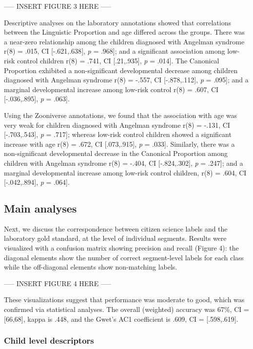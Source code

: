 \documentclass[
  english,
  ,man]{apa6}
\begin{document}
----- INSERT FIGURE 3 HERE -----

Descriptive analyses on the laboratory annotations showed that correlations between the Linguistic Proportion and age differed across the groups. There was a near-zero relationship among the children diagnosed with Angelman syndrome r(8) = .015, CI {[}-.621,.638{]}, \emph{p} = .968{]}; and a significant association among low-risk control children r(8) = .741, CI {[}.21,.935{]}, \emph{p} = .014{]}. The Canonical Proportion exhibited a non-significant developmental decrease among children diagnosed with Angelman syndrome r(8) = -.557, CI {[}-.878,.112{]}, \emph{p} = .095{]}; and a marginal developmental increase among low-risk control r(8) = .607, CI {[}-.036,.895{]}, \emph{p} = .063{]}.

Using the Zooniverse annotations, we found that the association with age was very weak for children diagnosed with Angelman syndrome r(8) = -.131, CI {[}-.703,.543{]}, \emph{p} = .717{]}; whereas low-risk control children showed a significant increase with age r(8) = .672, CI {[}.073,.915{]}, \emph{p} = .033{]}. Similarly, there was a non-significant developmental decrease in the Canonical Proportion among children with Angelman syndrome r(8) = -.404, CI {[}-.824,.302{]}, \emph{p} = .247{]}; and a marginal developmental increase among low-risk control children, r(8) = .604, CI {[}-.042,.894{]}, \emph{p} = .064{]}.

\hypertarget{main-analyses}{%
\subsection{Main analyses}\label{main-analyses}}

Next, we discuss the correspondence between citizen science labels and the laboratory gold standard, at the level of individual segments. Results were visualized with a confusion matrix showing precision and recall (Figure 4): the diagonal elements show the number of correct segment-level labels for each class while the off-diagonal elements show non-matching labels.

----- INSERT FIGURE 4 HERE -----

These visualizations suggest that performance was moderate to good, which was confirmed via statistical analyses. The overall (weighted) accuracy was 67\%, CI = {[}66,68{]}, kappa is .448, and the Gwet's AC1 coefficient is .609, CI = {[}.598,.619{]}.

\hypertarget{child-level-descriptors}{%
\subsubsection{Child level descriptors}\label{child-level-descriptors}}
\end{document}
